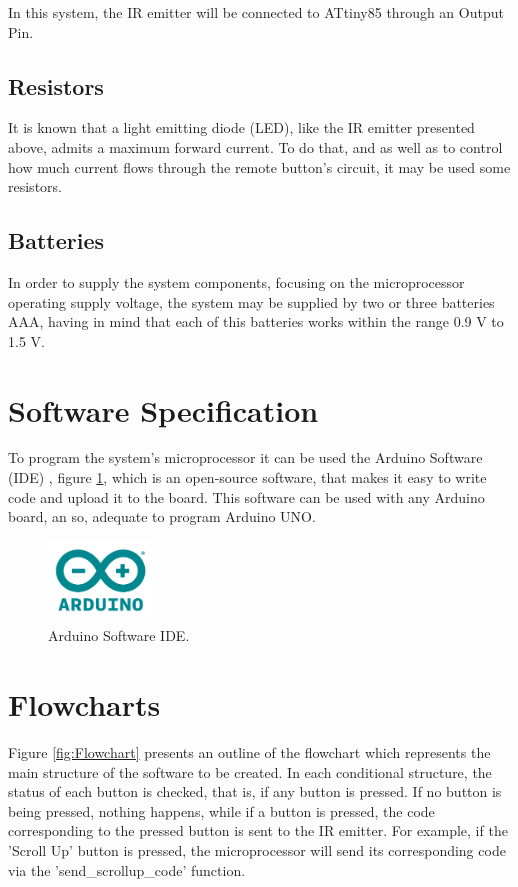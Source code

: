 \documentclass[12pt, letterpaper]{report}
\begin{document}
In this system, the IR emitter will be connected to ATtiny85 through an Output Pin.

\subsection{Resistors}
It is known that a light emitting diode (LED), like the IR emitter presented above, admits a maximum forward current. To do that, and as well as to control how much current flows through the remote button’s circuit, it may be used some resistors.

\subsection{Batteries}
In order to supply the system components, focusing on the microprocessor operating supply voltage, the system may be supplied by two or three batteries AAA, having in mind that each of this batteries works within the range 0.9 V to 1.5 V.

\section{Software Specification}
To program the system’s microprocessor it can be used the Arduino Software (IDE) \cite{arduino}, figure \ref{fig:arduino}, which is an open-source software, that makes it easy to write code and upload it to the board. This software can be used with any Arduino board, an so, adequate to program Arduino UNO.

\begin{figure}[ht]
	\centering
	\includegraphics[width=0.25\textwidth]{arduino}
	\caption{Arduino Software IDE.}
	\label{fig:arduino}
\end{figure}

\section{Flowcharts}
Figure \ref{fig:Flowchart} presents an outline of the flowchart which represents the main structure of the software to be created. In each conditional structure, the status of each button is checked, that is, if any button is pressed. If no button is being pressed, nothing happens, while if a button is pressed, the code corresponding to the pressed button is sent to the IR emitter. For example, if the 'Scroll Up' button is pressed, the microprocessor will send its corresponding code via the 'send\_scrollup\_code' function.
\end{document}
